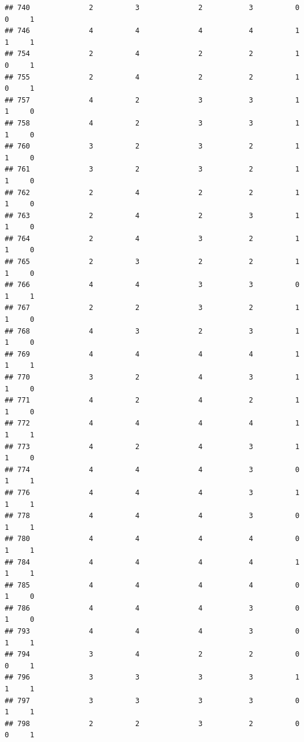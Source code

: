 \documentclass[
]{article}
\begin{document}
\begin{verbatim}
## 740              2          3              2           3          0    0     1
## 746              4          4              4           4          1    1     1
## 754              2          4              2           2          1    0     1
## 755              2          4              2           2          1    0     1
## 757              4          2              3           3          1    1     0
## 758              4          2              3           3          1    1     0
## 760              3          2              3           2          1    1     0
## 761              3          2              3           2          1    1     0
## 762              2          4              2           2          1    1     0
## 763              2          4              2           3          1    1     0
## 764              2          4              3           2          1    1     0
## 765              2          3              2           2          1    1     0
## 766              4          4              3           3          0    1     1
## 767              2          2              3           2          1    1     0
## 768              4          3              2           3          1    1     0
## 769              4          4              4           4          1    1     1
## 770              3          2              4           3          1    1     0
## 771              4          2              4           2          1    1     0
## 772              4          4              4           4          1    1     1
## 773              4          2              4           3          1    1     0
## 774              4          4              4           3          0    1     1
## 776              4          4              4           3          1    1     1
## 778              4          4              4           3          0    1     1
## 780              4          4              4           4          0    1     1
## 784              4          4              4           4          1    1     1
## 785              4          4              4           4          0    1     0
## 786              4          4              4           3          0    1     0
## 793              4          4              4           3          0    1     1
## 794              3          4              2           2          0    0     1
## 796              3          3              3           3          1    1     1
## 797              3          3              3           3          0    1     1
## 798              2          2              3           2          0    0     1

\end{verbatim}
\end{document}
